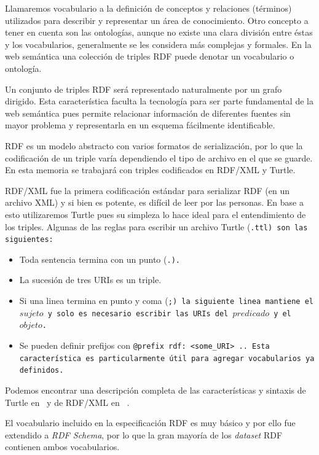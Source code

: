 Llamaremos vocabulario a la definición de conceptos y relaciones (términos)
utilizados para describir y representar un área de conocimiento.
Otro concepto a tener en cuenta son las ontologías, aunque no existe una clara 
división entre éstas y los vocabularios, generalmente se les considera más
complejas y formales.
En la web semántica una colección de triples RDF puede denotar un vocabulario o
ontología.

Un conjunto de triples RDF será representado naturalmente por un grafo dirigido.
Esta característica faculta la tecnología para ser parte fundamental de la web 
semántica pues permite relacionar información de diferentes fuentes sin mayor
problema y representarla en un esquema fácilmente identificable.

RDF es un modelo abstracto con varios formatos de serialización, por lo que la
codificación de un triple varía dependiendo el tipo de archivo en el que se
guarde. En esta memoria se trabajará con triples codificados en RDF/XML y
Turtle\cite{beckett2014turtle}.

RDF/XML fue la primera codificación estándar para serializar RDF (en un archivo
XML) y si bien es potente, es difícil de leer por las personas. En base a esto
utilizaremos Turtle pues su simpleza lo hace ideal para el entendimiento
de los triples. Algunas de las reglas para escribir un archivo Turtle 
(\tt{.ttl}) son las siguientes:
\begin{itemize}
  \item Toda sentencia termina con un punto (\tt{.}).
  \item La sucesión de tres URIs es un triple.
  \item 
    Si una linea termina en punto y coma (\tt{;}) la siguiente linea mantiene el
    $sujeto$ y solo es necesario escribir las URIs del $predicado$ y el
    $objeto$.
  \item 
    Se pueden definir prefijos con \tt{@prefix rdf: <some\_URI> .}. Esta
    característica es particularmente útil para agregar vocabularios ya
    definidos.
\end{itemize}

Podemos encontrar una descripción completa de las características y sintaxis de
Turtle en~\cite{beckett2014turtle} y de RDF/XML en ~\cite{beckett2004rdf}.

El vocabulario incluido en la especificación RDF es muy básico y por ello fue
extendido a \emph{RDF Schema}, por lo que la gran mayoría de los \emph{dataset}
RDF contienen ambos vocabularios.

